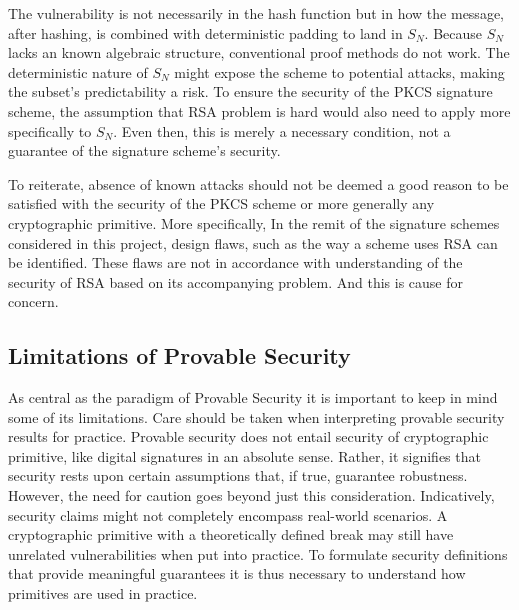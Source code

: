 \documentclass[]{final_report}
\theoremstyle{definition}
\begin{document}
The vulnerability is not necessarily in the hash function but in how the message, after hashing, is combined with deterministic padding to land in \( S_N \). Because \( S_N \) lacks an known algebraic structure, conventional proof methods do not work. The deterministic nature of \( S_N \) might expose the scheme to potential attacks, making the subset's predictability a risk. To ensure the security of the PKCS signature scheme, the assumption that RSA problem is hard would also need to apply more specifically to  $S_N$. Even then, this is merely a necessary condition, not a guarantee of the signature scheme's security. 

To reiterate, absence of known attacks should not be deemed a good reason to be satisfied with the security of the PKCS scheme or more generally any cryptographic primitive. More specifically, In the remit of the signature schemes considered in this project, design flaws, such as the way a scheme uses RSA can be identified. These flaws are  not in accordance with understanding of the security of RSA based on its accompanying problem. And this is cause for concern.


\subsection{Limitations of Provable Security}
As central as the paradigm of Provable Security it is important to keep in mind some of its limitations. Care should be taken when interpreting provable security results for practice. Provable security does not entail security of cryptographic primitive, like digital signatures in an absolute sense. Rather, it signifies that security rests upon certain assumptions that, if true, guarantee robustness. 
However, the need for caution goes beyond just this consideration. Indicatively, security claims might not completely encompass real-world scenarios. A cryptographic primitive with a theoretically defined break may still have unrelated vulnerabilities when put into practice. To formulate security definitions that provide meaningful guarantees it is thus necessary to understand how primitives are used in practice.
\end{document}
